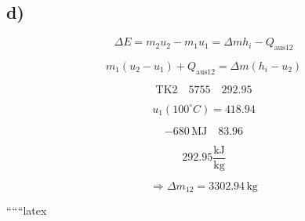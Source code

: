 

\subsection*{d)}

\[
\Delta E = m_2 u_2 - m_1 u_1 = \Delta m h_i - Q_{\text{aus12}}
\]

\[
m_1 (u_2 - u_1) + Q_{\text{aus12}} = \Delta m (h_i - u_2)
\]

\[
\text{TK2} \quad 5755 \quad 292.95
\]

\[
u_1 (100^\circ C) = 418.94
\]

\[
-680 \, \text{MJ} \quad 83.96
\]

\[
292.95 \frac{\text{kJ}}{\text{kg}}
\]

\[
\Rightarrow \Delta m_{12} = 3302.94 \, \text{kg}
\]

``````latex